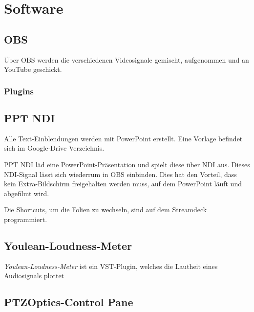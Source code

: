 \chapter{Software}
	\section{OBS}
		Über \Gls{OBS} werden die verschiedenen Videosignale gemischt, aufgenommen und an YouTube geschickt.
	
		\subsection{Plugins}
	\section{PPT NDI}
		Alle Text-Einblendungen werden mit PowerPoint erstellt.
		Eine Vorlage befindet sich im Google-Drive Verzeichnis.

		PPT NDI läd eine PowerPoint-Präsentation und spielt diese über \Gls{NDI} aus.
		Dieses \Gls{NDI}-Signal lässt sich wiederrum in \Gls{OBS} einbinden.
		Dies hat den Vorteil, dass kein Extra-Bildschirm freigehalten werden muss, auf dem PowerPoint läuft und abgefilmt wird.

		Die Shortcuts, um die Folien zu wechseln, sind auf dem Streamdeck programmiert.
	\section{Youlean-Loudness-Meter}
		\textit{Youlean-Loudness-Meter} ist ein \Gls{VST-Plugin}, welches die \Gls{Lautheit} eines Audiosignals plottet
	\section{PTZOptics-Control Pane}
